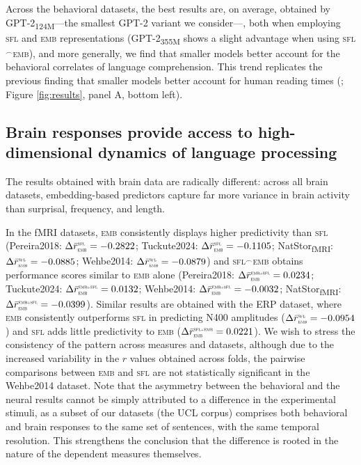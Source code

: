 \documentclass[11pt]{article}
\begin{document}
\smallskip 

Across the behavioral datasets, the best results are, on average, obtained by GPT-2\textsubscript{124M}---the smallest GPT-2 variant we consider---, both when employing \textsc{sfl} and \textsc{emb} representations (GPT-2\textsubscript{355M} shows a slight advantage when using \textsc{sfl}$^\frown$\textsc{emb}), and more generally, we find that smaller models better account for the behavioral correlates of language comprehension. This  trend replicates the previous finding that smaller models better account for human reading times (\citealp{oh2022does, oh2022comparison, shain_log, de2023scaling}; Figure \ref{fig:results}, panel A, bottom left).

\subsection{Brain responses provide access to high-dimensional dynamics of language processing}

The results obtained with brain data are  radically different: across all brain datasets, embedding-based predictors capture far more variance in brain activity than surprisal, frequency, and length.

\smallskip 

In the fMRI datasets, \textsc{emb} consistently displays higher predictivity than \textsc{sfl} (Pereira2018: $\Delta \bar{r}^{\scalebox{0.4}{SFL}}_{\scalebox{0.4}{EMB}} = -0.2822$; Tuckute2024: $\Delta \bar{r}^{\scalebox{0.4}{SFL}}_{\scalebox{0.4}{EMB}} = -0.1105$; NatStor\textsubscript{fMRI}: $\Delta \bar{r}^{\scalebox{0.4}{SFL}}_{\scalebox{0.4}{EMB}} = -0.0885$; Wehbe2014: $\Delta \bar{r}^{\scalebox{0.4}{SFL}}_{\scalebox{0.4}{EMB}} = -0.0879$) and \textsc{sfl}$^\frown$\textsc{emb} obtains performance scores similar to \textsc{emb} alone (Pereira2018: $\Delta \bar{r}^{\scalebox{0.4}{EMB+SFL}}_{\scalebox{0.4}{EMB}} = 0.0234$; Tuckute2024: $\Delta \bar{r}^{\scalebox{0.4}{EMB+SFL}}_{\scalebox{0.4}{EMB}} = 0.0132$; Wehbe2014: $\Delta \bar{r}^{\scalebox{0.4}{EMB+SFL}}_{\scalebox{0.4}{EMB}} = -0.0032$; NatStor\textsubscript{fMRI}: $\Delta \bar{r}^{\scalebox{0.4}{EMB+SFL}}_{\scalebox{0.4}{EMB}} = -0.0399$). Similar results are obtained with the ERP dataset, where \textsc{emb} consistently outperforms \textsc{sfl} in predicting N400 amplitudes ($\Delta \bar{r}^{\scalebox{0.4}{SFL}}_{\scalebox{0.4}{EMB}} = -0.0954$) and \textsc{sfl} adds little predictivity to \textsc{emb} ($\Delta \bar{r}^{\scalebox{0.4}{SFL+EMB}}_{\scalebox{0.4}{EMB}} = 0.0221$). We wish to stress the consistency of the pattern across measures and datasets, although due to the increased variability in the $r$ values obtained across folds, the pairwise comparisons between \textsc{emb} and \textsc{sfl} are not statistically significant in the Wehbe2014 dataset. Note that the asymmetry between the behavioral and the neural results cannot be simply attributed to a difference in the experimental stimuli, as a subset of our datasets (the UCL corpus) comprises both behavioral and brain responses to the same set of sentences, with the same temporal resolution. This strengthens the conclusion that the difference is rooted in the nature of the dependent measures themselves. 
\end{document}
